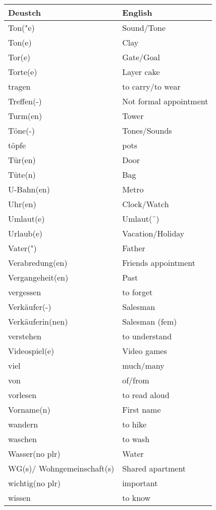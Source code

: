 \documentclass{article}
\renewcommand{\arraystretch}{1}
\begin{document}
\hfill
\begin{minipage}{0.48\textwidth}
    \centering
    \renewcommand{\arraystretch}{1.5}
    \begin{tabular}{|>{\raggedright\arraybackslash}p{3.5cm}|>{\raggedright\arraybackslash}p{3.5cm}|}
        \hline
        \rowcolor{gray!20} \textbf{Deustch} & \textbf{English} \\
        \hline
        Ton("e) & Sound/Tone \\\hline
        Ton(e) & Clay \\\hline
        Tor(e) & Gate/Goal \\\hline
        Torte(e) & Layer cake \\\hline
        tragen & to carry/to wear \\\hline
        Treffen(-) & Not formal appointment \\\hline
        Turm(en) & Tower \\\hline
        Töne(-) & Tones/Sounds \\\hline
        töpfe & pots \\\hline
        Tür(en) & Door \\\hline
        Tüte(n) & Bag \\\hline
        U-Bahn(en) & Metro \\\hline
        Uhr(en) & Clock/Watch \\\hline
        Umlaut(e) & Umlaut(¨) \\\hline
        Urlaub(e) & Vacation/Holiday \\\hline
        Vater(") & Father \\\hline
        Verabredung(en) & Friends appointment \\\hline
        Vergangeheit(en) & Past \\\hline
        vergessen & to forget \\\hline
        Verkäufer(-) & Salesman \\\hline
        Verkäuferin(nen) & Salesman (fem) \\\hline
        verstehen & to understand \\\hline
        Videospiel(e) & Video games \\\hline
        viel & much/many \\\hline
        von & of/from \\\hline
        vorlesen & to read aloud \\\hline
        Vorname(n) & First name \\\hline
        wandern & to hike \\\hline
        waschen & to wash \\\hline
        Wasser(no plr) & Water \\\hline
        WG(s)/ Wohngemeinschaft(s) & Shared apartment \\\hline
        wichtig(no plr) & important \\\hline
        wissen & to know \\\hline
    \end{tabular}
\end{minipage}
\end{document}
